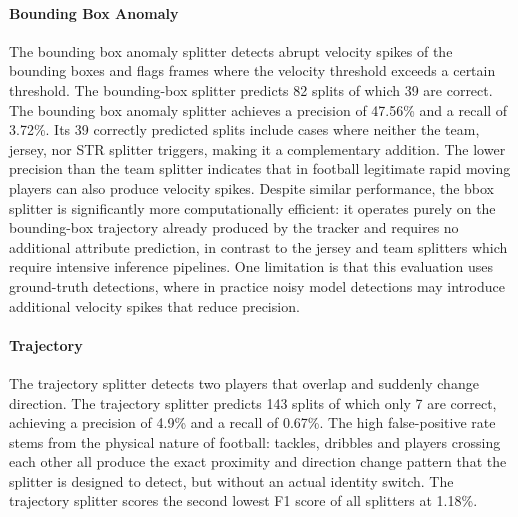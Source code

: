 \paragraph{Bounding Box Anomaly}
The bounding box anomaly splitter detects abrupt velocity spikes of the bounding boxes and flags frames where the velocity threshold exceeds a certain threshold. The bounding-box splitter predicts 82 splits of which 39 are correct. The bounding box anomaly splitter achieves a precision of 47.56\% and a recall of 3.72\%. Its 39 correctly predicted splits include cases where neither the team, jersey, nor STR splitter triggers, making it a complementary addition. The lower precision than the team splitter indicates that in football legitimate rapid moving players can also produce velocity spikes. Despite similar performance, the bbox splitter is significantly more computationally efficient: it operates purely on the bounding-box trajectory already produced by the tracker and requires no additional attribute prediction, in contrast to the jersey and team splitters which require intensive inference pipelines. One limitation is that this evaluation uses ground-truth detections, where in practice noisy model detections may introduce additional velocity spikes that reduce precision.


\paragraph{Trajectory}
The trajectory splitter detects two players that overlap and suddenly change direction. The trajectory splitter predicts 143 splits of which only 7 are correct, achieving a precision of 4.9\% and a recall of 0.67\%. The high false-positive rate stems from the physical nature of football: tackles, dribbles and players crossing each other all produce the exact proximity and direction change pattern that the splitter is designed to detect, but without an actual identity switch. The trajectory splitter scores the second lowest F1 score of all splitters at 1.18\%. 


